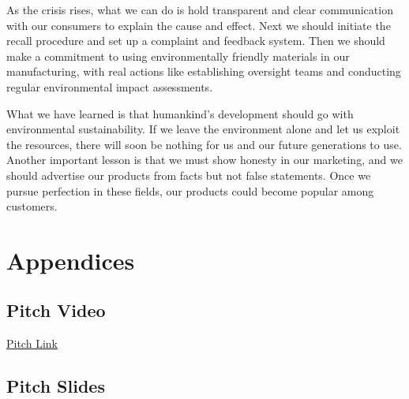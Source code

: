\documentclass[12pt]{article}
\begin{document}
As the crisis rises, what we can do is hold transparent and clear communication with our consumers to explain the cause and effect. Next we should initiate the recall procedure and set up a complaint and feedback system. Then we should make a commitment to using environmentally friendly materials in our manufacturing, with real actions like establishing oversight teams and conducting regular environmental impact assessments.

What we have learned is that humankind's development should go with environmental sustainability. If we leave the environment alone and let us exploit the resources, there will soon be nothing for us and our future generations to use. Another important lesson is that we must show honesty in our marketing, and we should advertise our products from facts but not false statements. Once we pursue perfection in these fields, our products could become popular among customers.




\appendix
\section{Appendices}

\subsection{Pitch Video}

\href{https://youtube.com/shorts/PAeucE88hLk}{Pitch Link}

\subsection{Pitch Slides}


\end{document}
